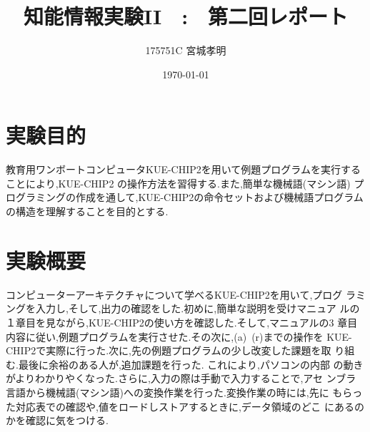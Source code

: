 \documentclass[a4paper,11pt,titlepage]{jarticle}
\title{知能情報実験II　:　第二回レポート}
\author{175751C 宮城孝明}
\date{\today}
\begin{document}
\maketitle
\tableofcontents
\clearpage
\section{実験目的}
 教育用ワンボートコンピュータKUE-CHIP2を用いて例題プログラムを実行する
 ことにより,KUE-CHIP2 の操作方法を習得する.また,簡単な機械語(マシン語)
 プログラミングの作成を通して,KUE-CHIP2の命令セットおよび機械語プログラム
 の構造を理解することを目的とする.
 \section{実験概要}
 コンピューターアーキテクチャについて学べるKUE-CHIP2を用いて,プログ
 ラミングを入力し,そして,出力の確認をした.初めに,簡単な説明を受けマニュア
 ルの１章目を見ながら,KUE-CHIP2の使い方を確認した.そして,マニュアルの3
 章目内容に従い,例題プログラムを実行させた.その次に,(a)~(r)までの操作を
 KUE-CHIP2で実際に行った.次に,先の例題プログラムの少し改変した課題を取
 り組む.最後に余裕のある人が,追加課題を行った. これにより,パソコンの内部
 の動きがよりわかりやくなった.さらに,入力の際は手動で入力することで,アセ
 ンブラ言語から機械語(マシン語)への変換作業を行った.変換作業の時には,先に
 もらった対応表での確認や,値をロードしストアするときに,データ領域のどこ
 にあるのかを確認に気をつける.
\end{document}
